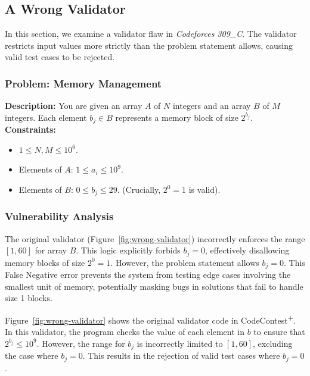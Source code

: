 \documentclass[11pt]{article}
\newcommand{\pl}{\textsuperscript{+}}
\begin{document}
\subsection{A Wrong Validator}

In this section, we examine a validator flaw in \textit{Codeforces 309\_C}. The validator restricts input values more strictly than the problem statement allows, causing valid test cases to be rejected.

\subsubsection{Problem: Memory Management}
\textbf{Description:} You are given an array $A$ of $N$ integers and an array $B$ of $M$ integers. Each element $b_j \in B$ represents a memory block of size $2^{b_j}$.
\newline
\textbf{Constraints:}
\begin{itemize}
    \item $1 \le N, M \le 10^6$.
    \item Elements of $A$: $1 \le a_i \le 10^9$.
    \item Elements of $B$: $0 \le b_j \le 29$. (Crucially, $2^0=1$ is valid).
\end{itemize}

\subsubsection{Vulnerability Analysis}
The original validator (Figure~\ref{fig:wrong-validator}) incorrectly enforces the range $[1, 60]$ for array $B$. This logic explicitly forbids $b_j=0$, effectively disallowing memory blocks of size $2^0=1$. However, the problem statement allows $b_j=0$.
This False Negative error prevents the system from testing edge cases involving the smallest unit of memory, potentially masking bugs in solutions that fail to handle size 1 blocks.

Figure~\ref{fig:wrong-validator} shows the original validator code in CodeContest\pl. In this validator, the program checks the value of each element in $b$ to ensure that $2^{b_j} \leq 10^9$. However, the range for $b_j$ is incorrectly limited to $[1, 60]$, excluding the case where $b_j = 0$. This results in the rejection of valid test cases where $b_j = 0$.
\end{document}

